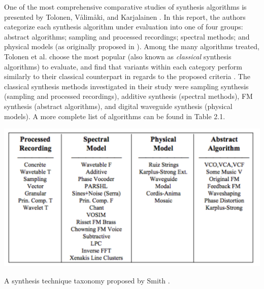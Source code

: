 \documentclass[a4paper,12pt]{report} 	%
\numberwithin{figure}{chapter}
\numberwithin{table}{chapter}
\numberwithin{equation}{chapter}
\begin{document}
\begin{flushleft}
One of the most comprehensive comparative studies of synthesis algorithms is presented by Tolonen, V\aa lim\aa ki, and Karjalainen \cite{Tolonen:1998bh}. In this report, the authors categorize each synthesis algorithm under evaluation into one of four groups: abstract algorithms; sampling and processed recordings; spectral methods; and physical models (as originally proposed in \cite{III:1991hc}). Among the many algorithms treated, Tolonen et al. choose the most popular (also known as \emph{classical} synthesis algorithms) to evaluate, and find that variants within each category perform similarly to their classical counterpart in regards to the proposed criteria \cite[p. 101]{Tolonen:1998bh}. The classical synthesis methods investigated in their study were sampling synthesis (sampling and processed recordings), additive synthesis (spectral methods), FM synthesis (abstract algorithms), and digital waveguide synthesis (physical models). A more complete list of algorithms can be found in Table 2.1.
\\
\begin{table}[h!]
\begin{center}
\includegraphics[scale=0.7]{SynthesisTechniqueTaxonomy}
\caption[Synthesis Technique Taxonomy]{A synthesis technique taxonomy proposed by Smith \protect\cite{III:1991hc}.}
\end{center}
\end{table}


\end{flushleft}
\end{document}
